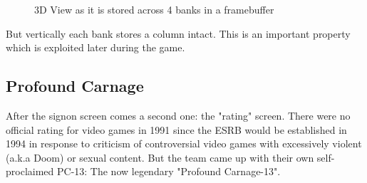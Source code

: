 \documentclass[book.tex]{subfiles}
\begin{document}
 \begin{figure}[H]
\centering
 \caption{3D View as it is stored across 4 banks in a framebuffer}
 \end{figure}
But vertically each bank stores a column intact. This is an important property which is exploited later during the game.
\par













\subsection{Profound Carnage}
After the signon screen comes a second one: the "rating" screen. There were no official rating for video games in 1991 since the ESRB would be established in 1994 in response to criticism of controversial video games with excessively violent (a.k.a Doom) or sexual content. But the team came up with their own self-proclaimed PC-13: The now legendary "Profound Carnage-13".\\
\begin{figure}[H]
\centering
{}
\end{figure}
\end{document}

